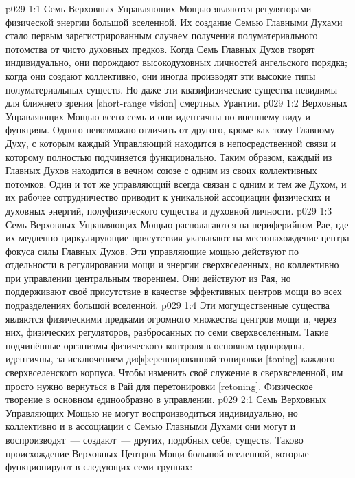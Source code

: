 \vs p029 1:1 Семь Верховных Управляющих Мощью являются регуляторами физической энергии большой вселенной. Их создание Семью Главными Духами стало первым зарегистрированным случаем получения полуматериального потомства от чисто духовных предков. Когда Семь Главных Духов творят индивидуально, они порождают высокодуховных личностей ангельского порядка; когда они создают коллективно, они иногда производят эти высокие типы полуматериальных существ. Но даже эти квазифизические существа невидимы для ближнего зрения [short\hyp{}range vision] смертных Урантии.
\vs p029 1:2 Верховных Управляющих Мощью всего семь и они идентичны по внешнему виду и функциям. Одного невозможно отличить от другого, кроме как тому Главному Духу, с которым каждый Управляющий находится в непосредственной связи и которому полностью подчиняется функционально. Таким образом, каждый из Главных Духов находится в вечном союзе с одним из своих коллективных потомков. Один и тот же управляющий всегда связан с одним и тем же Духом, и их рабочее сотрудничество приводит к уникальной ассоциации физических и духовных энергий, полуфизического существа и духовной личности.
\vs p029 1:3 Семь Верховных Управляющих Мощью располагаются на периферийном Рае, где их медленно циркулирующие присутствия указывают на местонахождение центра фокуса силы Главных Духов. Эти управляющие мощью действуют по отдельности в регулировании мощи и энергии сверхвселенных, но коллективно при управлении центральным творением. Они действуют из Рая, но поддерживают своё присутствие в качестве эффективных центров мощи во всех подразделениях большой вселенной.
\vs p029 1:4 Эти могущественные существа являются физическими предками огромного множества центров мощи и, через них, физических регуляторов, разбросанных по семи сверхвселенным. Такие подчинённые организмы физического контроля в основном однородны, идентичны, за исключением дифференцированной тонировки [toning] каждого сверхвселенского корпуса. Чтобы изменить своё служение в сверхвселенной, им просто нужно вернуться в Рай для перетонировки [retoning]. Физическое творение в основном единообразно в управлении.
\vs p029 2:1 Семь Верховных Управляющих Мощью не могут воспроизводиться индивидуально, но коллективно и в ассоциации с Семью Главными Духами они могут и воспроизводят~--- создают~--- других, подобных себе, существ. Таково происхождение Верховных Центров Мощи большой вселенной, которые функционируют в следующих семи группах:
